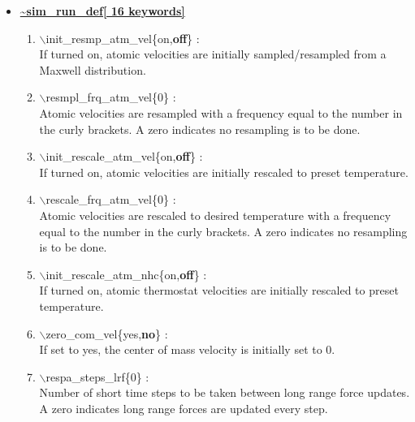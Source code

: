 \begin{itemize}
\clearpage
\huge
\item[] \underline{\bf \~{}sim\_run\_def[ 16 keywords]}
\begin{enumerate}
 \vspace{0.15in} \Large
 \item   $\backslash$init\_resmp\_atm\_vel\{on,{\bf off}\} : \\
     \large
     If turned on, atomic velocities are initially sampled/resampled from a 
     Maxwell distribution.


 \vspace{0.15in} \Large
 \item   $\backslash$resmpl\_frq\_atm\_vel\{0\} : \\
     \large
     Atomic velocities are resampled with a frequency equal to the number 
     in the curly brackets.  A zero indicates no resampling is to be done.


 \vspace{0.15in} \Large
 \item   $\backslash$init\_rescale\_atm\_vel\{on,{\bf off}\} : \\
    \large
    If turned on, atomic velocities are initially rescaled to preset 
    temperature.

 \vspace{0.15in} \Large
 \item   $\backslash$rescale\_frq\_atm\_vel\{0\} : \\
    \large
    Atomic velocities are rescaled to desired temperature
    with a frequency equal to the number in the
    curly brackets.  A zero indicates no resampling is to be done.

 \vspace{0.15in} \Large
 \item   $\backslash$init\_rescale\_atm\_nhc\{on,{\bf off}\} : \\
    \large
    If turned on, atomic thermostat velocities are initially rescaled to 
    preset temperature.

 \vspace{0.15in} \Large
 \item   $\backslash$zero\_com\_vel\{yes,{\bf no}\} : \\
    \large
    If set to yes, the center of mass velocity is initially set to 0.

 \vspace{0.15in} \Large
 \item   $\backslash$respa\_steps\_lrf\{0\} : \\
    \large
    Number of short time steps to be taken between long range force updates.
    A zero indicates long range forces are updated every step.


\end{enumerate}
\end{itemize}
